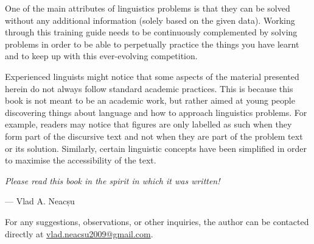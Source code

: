 One of the main attributes of linguistics problems is that they can be solved without any additional information (solely based on the given data). Working through this training guide needs to be continuously complemented by solving problems in order to be able to perpetually practice the things you have learnt and to keep up with this ever-evolving competition. 


Experienced linguists might notice that some aspects of the material presented herein do not always follow standard academic practices. This is because this book is not meant to be an academic work, but rather aimed at young people discovering things about language and how to approach linguistics problems. For example, readers may notice that figures are only labelled as such when they form part of the discursive text and not when they are part of the problem text or its solution. Similarly, certain linguistic concepts have been simplified in order to maximise the accessibility of the text. 


\textit{Please read this book in the spirit in which it was written!}

\begin{flushright} 
--- Vlad A. Neacșu
\end{flushright}

\bigskip

\begin{tblsfilled}{}
For any suggestions, observations, or other inquiries, the author can be contacted directly at \href{mailto:vlad.neacsu2009@gmail.com}{vlad.neacsu2009@gmail.com}.
\end{tblsfilled}
